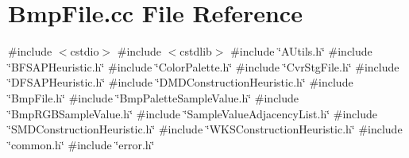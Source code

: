 \section{Bmp\+File.\+cc File Reference}
\label{BmpFile_8cc}
{\ttfamily \#include $<$cstdio$>$}\newline
{\ttfamily \#include $<$cstdlib$>$}\newline
{\ttfamily \#include \char`\"{}A\+Utils.\+h\char`\"{}}\newline
{\ttfamily \#include \char`\"{}B\+F\+S\+A\+P\+Heuristic.\+h\char`\"{}}\newline
{\ttfamily \#include \char`\"{}Color\+Palette.\+h\char`\"{}}\newline
{\ttfamily \#include \char`\"{}Cvr\+Stg\+File.\+h\char`\"{}}\newline
{\ttfamily \#include \char`\"{}D\+F\+S\+A\+P\+Heuristic.\+h\char`\"{}}\newline
{\ttfamily \#include \char`\"{}D\+M\+D\+Construction\+Heuristic.\+h\char`\"{}}\newline
{\ttfamily \#include \char`\"{}Bmp\+File.\+h\char`\"{}}\newline
{\ttfamily \#include \char`\"{}Bmp\+Palette\+Sample\+Value.\+h\char`\"{}}\newline
{\ttfamily \#include \char`\"{}Bmp\+R\+G\+B\+Sample\+Value.\+h\char`\"{}}\newline
{\ttfamily \#include \char`\"{}Sample\+Value\+Adjacency\+List.\+h\char`\"{}}\newline
{\ttfamily \#include \char`\"{}S\+M\+D\+Construction\+Heuristic.\+h\char`\"{}}\newline
{\ttfamily \#include \char`\"{}W\+K\+S\+Construction\+Heuristic.\+h\char`\"{}}\newline
{\ttfamily \#include \char`\"{}common.\+h\char`\"{}}\newline
{\ttfamily \#include \char`\"{}error.\+h\char`\"{}}\newline
